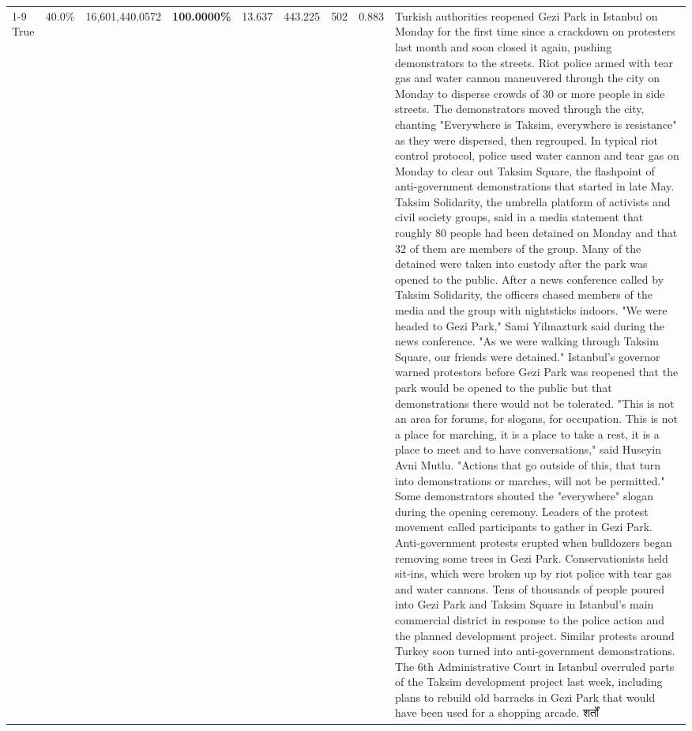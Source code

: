 \begin{table}[H]
\begin{tabular}{lllrlllll}
\cline{1-9}
True & 40.0\% & 16,601,440.0572 & \bfseries \color{red} 100.0000\% & 13.637 & 443.225 & 502 & 0.883 & Turkish authorities reopened Gezi Park in Istanbul on Monday for the first time since a crackdown on protesters last month and soon closed it again, pushing demonstrators to the streets. Riot police armed with tear gas and water cannon maneuvered through the city on Monday to disperse crowds of 30 or more people in side streets. The demonstrators moved through the city, chanting "Everywhere is Taksim, everywhere is resistance" as they were dispersed, then regrouped. In typical riot control protocol, police used water cannon and tear gas on Monday to clear out Taksim Square, the flashpoint of anti-government demonstrations that started in late May. Taksim Solidarity, the umbrella platform of activists and civil society groups, said in a media statement that roughly 80 people had been detained on Monday and that 32 of them are members of the group. Many of the detained were taken into custody after the park was opened to the public. After a news conference called by Taksim Solidarity, the officers chased members of the media and the group with nightsticks indoors. "We were headed to Gezi Park," Sami Yilmazturk said during the news conference. "As we were walking through Taksim Square, our friends were detained." Istanbul's governor warned protestors before Gezi Park was reopened that the park would be opened to the public but that demonstrations there would not be tolerated. "This is not an area for forums, for slogans, for occupation. This is not a place for marching, it is a place to take a rest, it is a place to meet and to have conversations," said Huseyin Avni Mutlu. "Actions that go outside of this, that turn into demonstrations or marches, will not be permitted." Some demonstrators shouted the "everywhere" slogan during the opening ceremony. Leaders of the protest movement called participants to gather in Gezi Park. Anti-government protests erupted when bulldozers began removing some trees in Gezi Park. Conservationists held sit-ins, which were broken up by riot police with tear gas and water cannons. Tens of thousands of people poured into Gezi Park and Taksim Square in Istanbul's main commercial district in response to the police action and the planned development project. Similar protests around Turkey soon turned into anti-government demonstrations. The 6th Administrative Court in Istanbul overruled parts of the Taksim development project last week, including plans to rebuild old barracks in Gezi Park that would have been used for a shopping arcade. शर्तों \\

\end{tabular}
\end{table}
